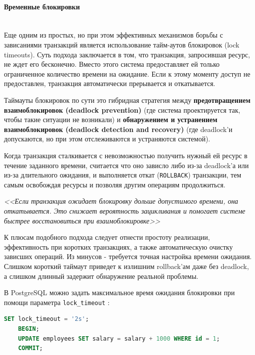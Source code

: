 \paragraph{Временные блокировки} ~\\

Еще одним из простых, но при этом эффективных механизмов борьбы с зависаниями транзакций является использование тайм-аутов блокировок (lock timeouts). Суть подхода заключается в том, что транзакция, запросившая ресурс, не ждет его бесконечно. Вместо этого система предоставляет ей только ограниченное количество времени на ожидание. Если к этому моменту доступ не предоставлен, транзакция автоматически прерывается и откатывается. \autocite[ch.18]{Silberschatz}

Таймауты блокировок по сути это гибридная стратегия между \textbf{предотвращением взаимоблокировок (deadlock prevention)} (где система проектируется так, чтобы такие ситуации не возникали) и \textbf{обнаружением и устранением взаимоблокировок (deadlock detection and recovery)} (где deadlock'и допускаются, но при этом отслеживаются и устраняются системой).

Когда транзакция сталкивается с невозможностью получить нужный ей ресурс в течение заданного времени, считается что оно зависло либо из-за deadlock'а или из-за длительного ожидания, и выполняется откат (\texttt{ROLLBACK}) транзакции, тем самым освобождая ресурсы и позволяя другим операциям продолжиться.

\begin{grayquote}
    \textit{<<Если транзакция ожидает блокировку дольше допустимого времени, она откатывается. Это снижает вероятность зацикливания и помогает системе быстрее восстановиться при взаимоблокировке>>} \autocite[ch.18]{Silberschatz}
\end{grayquote}

К плюсам подобного подхода следует отнести простоту реализации, эффективность при коротких транзакциях, а также автоматическую очистку зависших операций.
Из минусов - требуется точная настройка времени ожидания. Слишком короткий таймаут приведет к излишним rollback'ам даже без deadlock, а слишком длинный задержит обнаружение реальной проблемы. \autocite[ch.22]{ElmasriNavathe}

В PostgreSQL можно задать максимальное время ожидания блокировки при помощи параметра \texttt{lock\_timeout} \autocite[§19.11]{PostgreSQLdocc19}:
\begin{lstlisting}[language=SQL]
    SET lock_timeout = '2s';
    BEGIN;
    UPDATE employees SET salary = salary + 1000 WHERE id = 1;
    COMMIT;
\end{lstlisting}

